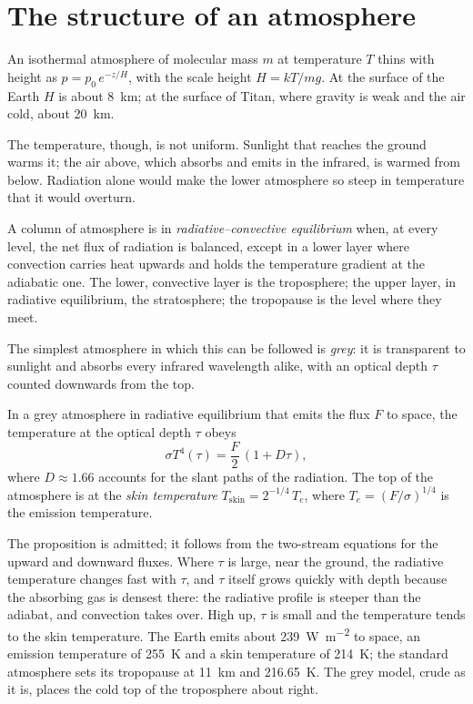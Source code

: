 \section{The structure of an atmosphere}\label{sec:b3:planetary-atmospheres:structure}

An isothermal atmosphere of molecular mass $m$ at temperature $T$ thins
with height as $p = p_0\,e^{-z/H}$, with the scale height $H = kT/mg$. At
the surface of the Earth $H$ is about \qty{8}{km}; at the surface of
Titan, where gravity is weak and the air cold, about \qty{20}{km}.

The temperature, though, is not uniform. Sunlight that reaches the ground
warms it; the air above, which absorbs and emits in the infrared, is
warmed from below. Radiation alone would make the lower atmosphere so
steep in temperature that it would overturn.

\begin{definition}\label{def:b3:planetary-atmospheres:rce}
A column of atmosphere is in \emph{radiative--convective
equilibrium} when, at every
level, the net flux of radiation is balanced, except in a lower layer
where convection carries heat upwards and holds the temperature gradient
at the adiabatic one. The lower, convective layer is the troposphere; the
upper layer, in radiative equilibrium, the stratosphere; the tropopause
is the level where they meet.
\end{definition}

The simplest atmosphere in which this can be followed is \emph{grey}: it
is transparent to sunlight and absorbs every infrared wavelength alike,
with an optical depth $\tau$ counted downwards from the top.

\begin{proposition}\label{prop:b3:planetary-atmospheres:grey}
In a grey atmosphere in radiative equilibrium that emits the flux $F$ to
space, the temperature at the optical depth $\tau$ obeys
\[
\sigma T^4(\tau) = \frac F2\,(1 + D\tau),
\]
where $D \approx 1.66$ accounts for the slant paths of the radiation.
The top of the atmosphere is at the \emph{skin temperature}
$T_\mathrm{skin} = 2^{-1/4}\,T_e$, where $T_e = (F/\sigma)^{1/4}$ is the
emission temperature.
\end{proposition}

The proposition is admitted; it follows from the two-stream equations for
the upward and downward fluxes. Where $\tau$ is large, near the ground,
the radiative temperature changes fast with $\tau$, and $\tau$ itself
grows quickly with depth because the absorbing gas is densest there: the
radiative profile is steeper than the adiabat, and convection takes over.
High up, $\tau$ is small and the temperature tends to the skin
temperature. The Earth emits about \qty{239}{W.m^{-2}} to space, an
emission temperature of \qty{255}{K} and a skin temperature of
\qty{214}{K}; the standard atmosphere sets its tropopause at \qty{11}{km}
and \qty{216.65}{K}. The grey model, crude as it is, places the cold top of
the troposphere about right.

